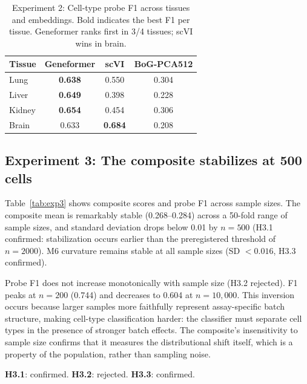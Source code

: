 \documentclass[11pt,letterpaper]{article}
\begin{document}
\begin{table}[t]
\centering
\caption{Experiment 2: Cell-type probe F1 across tissues and embeddings. Bold indicates the best F1 per tissue. Geneformer ranks first in 3/4 tissues; scVI wins in brain.}
\label{tab:exp2_f1}
\small
\begin{tabular}{@{}lccc@{}}
\toprule
Tissue & Geneformer & scVI & BoG-PCA512 \\
\midrule
Lung   & \textbf{0.638} & 0.550 & 0.304 \\
Liver  & \textbf{0.649} & 0.398 & 0.228 \\
Kidney & \textbf{0.654} & 0.454 & 0.306 \\
Brain  & 0.633 & \textbf{0.684} & 0.208 \\
\bottomrule
\end{tabular}
\end{table}

\subsection{Experiment 3: The composite stabilizes at 500 cells}

Table~\ref{tab:exp3} shows composite scores and probe F1 across sample sizes. The composite mean is remarkably stable (0.268--0.284) across a 50-fold range of sample sizes, and standard deviation drops below 0.01 by $n = 500$ (H3.1 confirmed: stabilization occurs earlier than the preregistered threshold of $n = 2000$). M6 curvature remains stable at all sample sizes (SD $< 0.016$, H3.3 confirmed).

Probe F1 does not increase monotonically with sample size (H3.2 rejected). F1 peaks at $n = 200$ (0.744) and decreases to 0.604 at $n = 10{,}000$. This inversion occurs because larger samples more faithfully represent assay-specific batch structure, making cell-type classification harder: the classifier must separate cell types in the presence of stronger batch effects. The composite's insensitivity to sample size confirms that it measures the distributional shift itself, which is a property of the population, rather than sampling noise.

\textbf{H3.1}: confirmed. \textbf{H3.2}: rejected. \textbf{H3.3}: confirmed.
\end{document}
